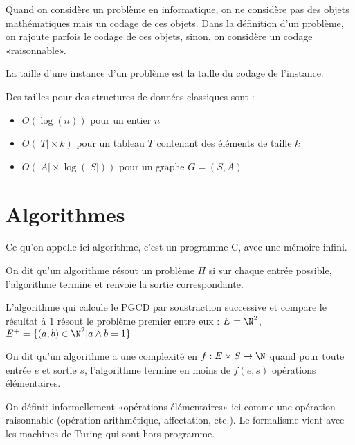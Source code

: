\begin{rem}
	Quand on considère un problème en informatique, on ne considère pas des objets mathématiques mais un codage de ces objets. Dans la définition d'un problème, on rajoute parfois le codage de ces objets, sinon, on considère un codage «raisonnable».
\end{rem}

\begin{definition}
	La taille d'une instance d'un problème est la taille du codage de l'instance.
\end{definition}

\begin{example}
	Des tailles pour des structures de données classiques sont :
	\begin{itemize}	[label=$\star$]
		\item $O(\log(n))$ pour un entier $n$
		\item $O(|T| \times k)$ pour un tableau $T$ contenant des éléments de taille $k$
		\item $O(|A|\times \log(|S|))$ pour un graphe $G = (S, A)$
	\end{itemize}
\end{example}

\section{Algorithmes}

Ce qu'on appelle ici algorithme, c'est un programme C, avec une mémoire infini.

\begin{definition}
	On dit qu'un algorithme résout un problème $\Pi$ si sur chaque entrée possible, l'algorithme termine et renvoie la sortie correspondante.
\end{definition}

\begin{example}
	\label{31-pgcd}
	L'algorithme qui calcule le PGCD par soustraction successive et compare le résultat à $1$ résout le problème premier entre eux : $E = \N^2$, $E^+ = \{(a, b)\in \N^2 | a\wedge b = 1\}$
\end{example}

\begin{definition}
	On dit qu'un algorithme a une complexité en $f:E \times S \to \N$ quand pour toute entrée $e$ et sortie $s$, l'algorithme termine en moins de $f(e, s)$ opérations élémentaires.
\end{definition}

\begin{rem}
	On définit informellement «opérations élémentaires» ici comme une opération raisonnable (opération arithmétique, affectation, etc.). Le formalisme vient avec les machines de Turing qui sont hors programme.
\end{rem}

